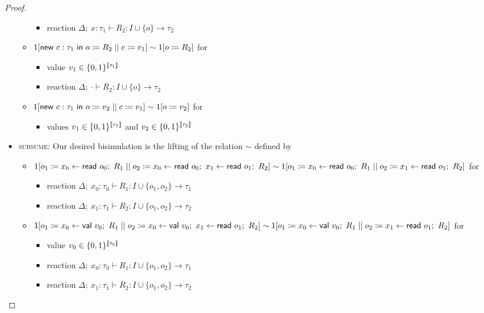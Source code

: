 \begin{proof}
\begin{itemize}
\begin{itemize}
\begin{itemize}
\item reaction $\Delta; \ x : \tau_1 \vdash R_2 : I \cup \{o\} \to \tau_2$
\end{itemize}
\item $1[\mathsf{new} \ c : \tau_1 \ \mathsf{in} \ o \coloneqq R_2 \; || \; c \coloneqq v_1] \sim 1[o \coloneqq R_2]$ for
\begin{itemize}
\item value $v_1 \in \{0,1\}^{\llbracket \tau_1 \rrbracket}$
\item reaction $\Delta; \ \cdot \vdash R_2 : I \cup \{o\} \to \tau_2$
\end{itemize}
\item $1[\mathsf{new} \ c : \tau_1 \ \mathsf{in} \ o \coloneqq v_2 \; || \; c \coloneqq v_1] \sim 1[o \coloneqq v_2]$ for
\begin{itemize}
\item values $v_1 \in \{0,1\}^{\llbracket \tau_1 \rrbracket}$ and $v_2 \in \{0,1\}^{\llbracket \tau_2 \rrbracket}$
\end{itemize}
\end{itemize}
\item \textsc{subsume}: Our desired bisimulation is the lifting of the relation $\sim$ defined by
\begin{itemize}
\item $1[\Par{\assign{o_1}{x_0 \leftarrow \read{o_0}; \ R_1}}{\assign{o_2}{x_0 \leftarrow \read{o_0}; \ x_1 \leftarrow \read{o_1}; \ R_2}}] \sim \\ 1[\Par{\assign{o_1}{x_0 \leftarrow \read{o_0}; \ R_1}}{\assign{o_2}{x_1 \leftarrow \read{o_1}; \ R_2}}]$ for
\begin{itemize}
\item reaction $\Delta; \ x_0 : \tau_0 \vdash R_1 : I \cup \{o_1,o_2\} \to \tau_1$
\item reaction $\Delta; \ x_1 : \tau_1 \vdash R_2 : I \cup \{o_1,o_2\} \to \tau_2$
\end{itemize}
\item $1[\Par{\assign{o_1}{x_0 \leftarrow \val{v_0}; \ R_1}}{\assign{o_2}{x_0 \leftarrow \val{v_0}; \ x_1 \leftarrow \read{o_1}; \ R_2}}] \sim \\ 1[\Par{\assign{o_1}{x_0 \leftarrow \val{v_0}; \ R_1}}{\assign{o_2}{x_1 \leftarrow \read{o_1}; \ R_2}}]$ for
\begin{itemize}
\item value $v_0 \in \{0,1\}^{\llbracket \tau_0 \rrbracket}$
\item reaction $\Delta; \ x_0 : \tau_0 \vdash R_1 : I \cup \{o_1,o_2\} \to \tau_1$
\item reaction $\Delta; \ x_1 : \tau_1 \vdash R_2 : I \cup \{o_1,o_2\} \to \tau_2$

\end{itemize}
\end{itemize}
\end{itemize}
\end{proof}
